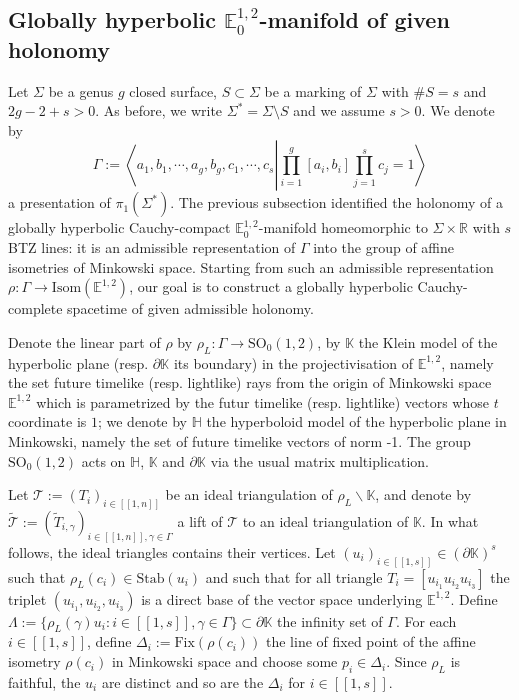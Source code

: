 \documentclass[a4paper,12pt]{article}
\def\H{\mathbb{H}}
\def\stab{\mathrm{Stab}}
\def\GG{\SO_0(1,2)}
\def\isom{Isom}
\def\lsem{[\![}
\def\rsem{]\!]}
\def\SO{\mathrm{SO}}
\def\RR{\mathbb{R}}
\newcommand{\mass}[1]{{\mathbb E}^{1,2}_{#1}}
\def\isom{\mathrm{Isom}}
\def\fix{\mathrm{Fix}}
\begin{document}
\subsection{Globally hyperbolic $\mass{0}$-manifold of given holonomy}
\label{sec:polyedron}
Let $\Sigma$ be a genus $g$ closed surface, $S\subset \Sigma$ be a marking of $\Sigma$ with $\#S=s$ and $2g-2+s>0$. As before, we write $\Sigma^* = \Sigma \setminus S$ and we assume $s>0$. We denote by $$\Gamma:= \left\langle a_1,b_1,\cdots,a_g,b_g, c_1,\cdots,c_s \left |  \prod_{i=1}^g [a_i,b_i] \prod_{j=1}^s c_j=1\right.\right\rangle$$ a presentation of $\pi_1(\Sigma^*)$.
The previous subsection identified the holonomy of a globally hyperbolic Cauchy-compact $\mass{0}$-manifold homeomorphic to $\Sigma\times \RR$ with $s$ BTZ lines:  it is an admissible representation of $\Gamma$ into the group of affine isometries of Minkowski space.
Starting from such an admissible representation $\rho: \Gamma \rightarrow \isom(\mass{})$, our goal is to construct a globally hyperbolic Cauchy-complete spacetime of given admissible holonomy.  

Denote the linear part of $\rho$ by $\rho_L:\Gamma\rightarrow \GG$, by
   $\mathbb K$ the Klein model of the hyperbolic plane (resp. $\partial \mathbb K$ its boundary) in the projectivisation of $\mass{}$, namely the set future timelike (resp. lightlike) rays from the origin of Minkowski space $\mass{}$ which is parametrized by the futur timelike (resp. lightlike) vectors whose  $t$ coordinate is $1$;  we denote by $\H$ the hyperboloid model of the hyperbolic plane in Minkowski, namely the set of future timelike vectors of norm -1. The group $\GG$ acts on $\H$, $\mathbb K$ and $\partial\mathbb K$ via the usual  matrix multiplication.

   
 
 Let $\mathcal T:= \left(T_i\right)_{i\in \lsem 1,n\rsem}$ be an ideal triangulation of $\rho_L\backslash \mathbb K$, and denote by $\widetilde{\mathcal T}:= \left(\widetilde T_{i,\gamma}\right)_{i\in \lsem 1,n\rsem,\gamma\in\Gamma}$ a lift of $\mathcal T$ to an ideal triangulation of $\mathbb K$. In what follows, the ideal triangles contains their vertices.  Let $(u_{i})_{i\in \lsem 1,s\rsem} \in (\partial \mathbb K)^s$ such that $\rho_L(c_i)\in \stab(u_i)$ and such that for all triangle $T_{i} = [u_{i_1}u_{i_2}u_{i_3}]$ the triplet $(u_{i_1},u_{i_2},u_{i_3})$ is a direct base of the vector space underlying $\mass{}$. 
 Define  $\Lambda := \{\rho_L(\gamma) u_i:i\in \lsem1,s\rsem, \gamma \in \Gamma \}\subset \partial\mathbb K$  the infinity set of $\Gamma$.  
 For each $i\in \lsem 1,s\rsem$, define $\Delta_{i}:= \fix(\rho(c_i))$ the line of fixed point of the affine isometry $\rho(c_i)$ in Minkowski space and choose some $p_i \in \Delta_i$.  Since $\rho_L$ is faithful, the $u_i$ are distinct and so are the $\Delta_i$ for $i\in \lsem 1,s\rsem$.
   
\end{document}
